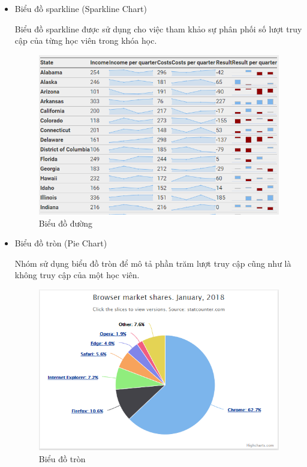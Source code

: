 \begin{itemize}
	\item Biểu đồ sparkline (Sparkline Chart)
	
	Biểu đồ sparkline được sử dụng cho việc tham khảo sự phân phối số lượt truy cập của từng học viên trong khóa học.
	
	\begin{center}
		\begin{figure}[htp]
			\begin{center}
				\includegraphics[scale=0.7]{img/line}
			\end{center}
			\caption{Biểu đồ đường}
			\label{refhinh18}
		\end{figure}
	\end{center}

	\vskip 6cm
	\item Biểu đồ tròn (Pie Chart)
	
	Nhóm sử dụng biểu đồ tròn để mô tả phần trăm lượt truy cập cũng như là không truy cập của một học viên.
	
	\begin{center}
		\begin{figure}[htp]
			\begin{center}
				\includegraphics[scale=0.7]{img/piechart}
			\end{center}
			\caption{Biểu đồ tròn}
			\label{refhinh79}
		\end{figure}
	\end{center}


\end{itemize}
